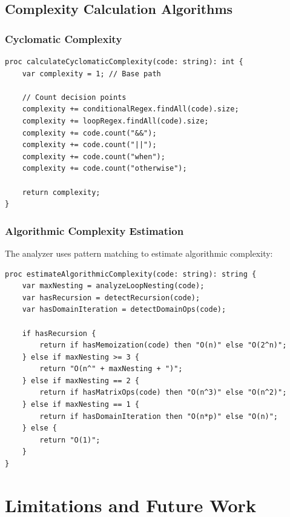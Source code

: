 \documentclass[11pt,a4paper]{article}
\begin{document}
\subsection{Complexity Calculation Algorithms}

\subsubsection{Cyclomatic Complexity}

\begin{lstlisting}[style=chapel, caption=Cyclomatic Complexity Calculation]
proc calculateCyclomaticComplexity(code: string): int {
    var complexity = 1; // Base path
    
    // Count decision points
    complexity += conditionalRegex.findAll(code).size;
    complexity += loopRegex.findAll(code).size;
    complexity += code.count("&&");
    complexity += code.count("||");
    complexity += code.count("when");
    complexity += code.count("otherwise");
    
    return complexity;
}
\end{lstlisting}

\subsubsection{Algorithmic Complexity Estimation}

The analyzer uses pattern matching to estimate algorithmic complexity:

\begin{lstlisting}[style=chapel, caption=Algorithmic Complexity Estimation]
proc estimateAlgorithmicComplexity(code: string): string {
    var maxNesting = analyzeLoopNesting(code);
    var hasRecursion = detectRecursion(code);
    var hasDomainIteration = detectDomainOps(code);
    
    if hasRecursion {
        return if hasMemoization(code) then "O(n)" else "O(2^n)";
    } else if maxNesting >= 3 {
        return "O(n^" + maxNesting + ")";
    } else if maxNesting == 2 {
        return if hasMatrixOps(code) then "O(n^3)" else "O(n^2)";
    } else if maxNesting == 1 {
        return if hasDomainIteration then "O(n*p)" else "O(n)";
    } else {
        return "O(1)";
    }
}
\end{lstlisting}

\section{Limitations and Future Work}
\end{document}
